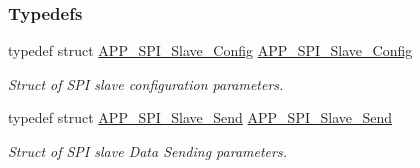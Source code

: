 \subsubsection*{Typedefs}
\begin{DoxyCompactItemize}
\item 
typedef struct \hyperlink{struct_a_p_p___s_p_i___slave___config}{A\+P\+P\+\_\+\+S\+P\+I\+\_\+\+Slave\+\_\+\+Config} \hyperlink{group___s_p_i___s_l_a_v_e_gac4efd2b33719820a530c1aa2e76bb482}{A\+P\+P\+\_\+\+S\+P\+I\+\_\+\+Slave\+\_\+\+Config}\hypertarget{group___s_p_i___s_l_a_v_e_gac4efd2b33719820a530c1aa2e76bb482}{}\label{group___s_p_i___s_l_a_v_e_gac4efd2b33719820a530c1aa2e76bb482}

\begin{DoxyCompactList}\small\item\em Struct of S\+PI slave configuration parameters. \end{DoxyCompactList}\item 
typedef struct \hyperlink{struct_a_p_p___s_p_i___slave___send}{A\+P\+P\+\_\+\+S\+P\+I\+\_\+\+Slave\+\_\+\+Send} \hyperlink{group___s_p_i___s_l_a_v_e_ga1edd267195cf3bb3fd25ff14691dfb9f}{A\+P\+P\+\_\+\+S\+P\+I\+\_\+\+Slave\+\_\+\+Send}\hypertarget{group___s_p_i___s_l_a_v_e_ga1edd267195cf3bb3fd25ff14691dfb9f}{}\label{group___s_p_i___s_l_a_v_e_ga1edd267195cf3bb3fd25ff14691dfb9f}

\begin{DoxyCompactList}\small\item\em Struct of S\+PI slave Data Sending parameters. \end{DoxyCompactList}\end{DoxyCompactItemize}
